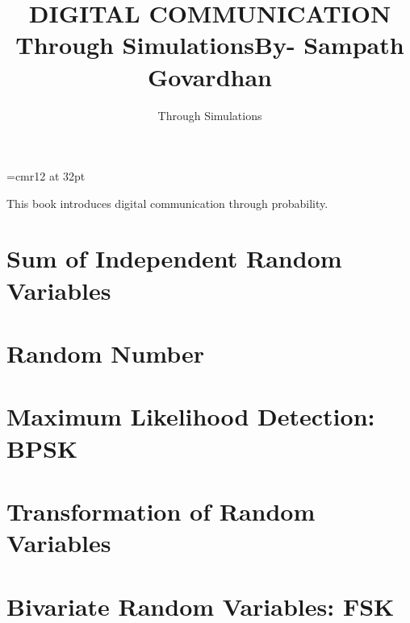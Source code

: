 \documentclass[12pt]{book}
\begin{document}
\font\myfont=cmr12 at 32pt

\frontmatter


\subtitle{Through Simulations}


\title{\myfont DIGITAL COMMUNICATION}
\title{ }
\bigskip

\title{\myfont Through Simulations}
\bigskip
\title{By- Sampath Govardhan}
\tableofcontents



\setcounter{page}{1}

\begin{introduction}
This book introduces digital communication through probability.

\end{introduction}

\mainmatter

\chapter{Sum of Independent Random Variables}


\chapter{Random Number}


\chapter{Maximum Likelihood Detection: BPSK}


\chapter{Transformation of Random Variables}


\chapter{Bivariate Random Variables: FSK}


\backmatter
\appendix

\latexprintindex
\end{document}
